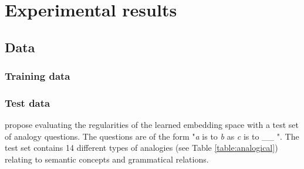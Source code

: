 
\section{Experimental results}

\subsection{Data}

\subsubsection{Training data}

\subsubsection{Test data}\label{sec:test_data}
\cite{mikolov3} propose evaluating the regularities of the learned embedding space with a test set of analogy questions. The questions are of the form "{\it a} is to {\it b} as {\it c} is to \_\_ ". The test set contains 14 different types of analogies (see Table \ref{table:analogical}) relating to semantic concepts and grammatical relations. 

